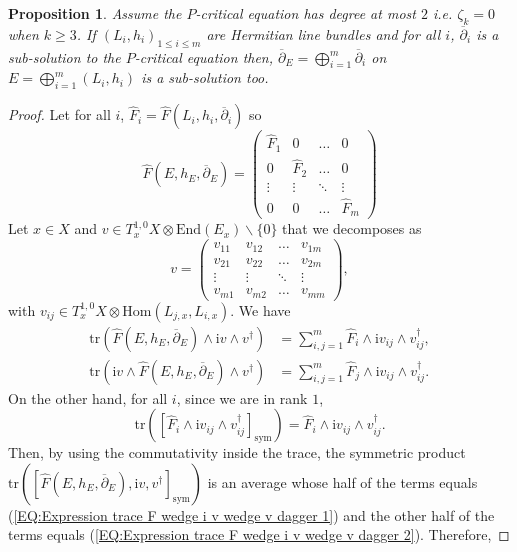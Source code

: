 \documentclass{article}
\newtheorem{proposition}[theorem]{Proposition}
\theoremstyle{remark}
\theoremstyle{definition}
\newcommand{\Hom}{\mathrm{Hom}}
\newcommand{\End}{\mathrm{End}}
\newcommand{\tr}{\mathrm{tr}}
\renewcommand{\i}{\boldsymbol{\mathrm{i}}}
\newcommand{\dbar}{\overline{\partial}}
\newcommand{\sym}{\mathrm{sym}}
\renewcommand{\leq}{\leqslant}
\renewcommand{\geq}{\geqslant}
\begin{document}
\begin{proposition}\label{PRO:Somme de sous-solutions fibrés}
    Assume the $P$-critical equation has degree at most $2$ \textit{i.e.} $\zeta_k = 0$ when $k \geq 3$. If $(L_i,h_i)_{1 \leq i \leq m}$ are Hermitian line bundles and for all $i$, $\dbar_i$ is a sub-solution to the $P$-critical equation then, $\dbar_E = \bigoplus_{i = 1}^m \dbar_i$ on $E = \bigoplus_{i = 1}^m (L_i,h_i)$ is a sub-solution too.
\end{proposition}
\begin{proof}
Let for all $i$, $\hat{F}_i = \hat{F}(L_i,h_i,\dbar_i)$ so
$$
\hat{F}(E,h_E,\dbar_E) =
\begin{pmatrix}
    \hat{F}_1 & 0 & \hdots & 0\\
    0 & \hat{F}_2 & \hdots & 0\\
    \vdots & \vdots & \ddots & \vdots\\
    0 & 0 & \hdots & \hat{F}_m
\end{pmatrix}
$$
Let $x \in X$ and $v \in T_x^{1,0}X \otimes \End(E_x)\backslash\{0\}$ that we decomposes as
$$
v =
\begin{pmatrix}
    v_{11} & v_{12} & \hdots & v_{1m}\\
    v_{21} & v_{22} & \hdots & v_{2m}\\
    \vdots & \vdots & \ddots & \vdots\\
    v_{m1} & v_{m2} & \hdots & v_{mm}
\end{pmatrix},
$$
with $v_{ij} \in T_x^{1,0}X \otimes \Hom(L_{j,x},L_{i,x})$. We have
\begin{align}
    \tr(\hat{F}(E,h_E,\dbar_E) \wedge \i v \wedge v^\dagger) & = \sum_{i,j = 1}^m \hat{F}_i \wedge \i v_{ij} \wedge v_{ij}^\dagger, \label{EQ:Expression trace F wedge i v wedge v dagger 1}\\
    \tr(\i v \wedge \hat{F}(E,h_E,\dbar_E) \wedge v^\dagger) & = \sum_{i,j = 1}^m \hat{F}_j \wedge \i v_{ij} \wedge v_{ij}^\dagger. \label{EQ:Expression trace F wedge i v wedge v dagger 2}
\end{align}
On the other hand, for all $i$, since we are in rank $1$,
$$
\tr([\hat{F}_i \wedge \i v_{ij} \wedge v_{ij}^\dagger]_\sym) = \hat{F}_i \wedge \i v_{ij} \wedge v_{ij}^\dagger.
$$
Then, by using the commutativity inside the trace, the symmetric product $\tr([\hat{F}(E,h_E,\dbar_E),\i v,v^\dagger]_\sym)$ is an average whose half of the terms equals (\ref{EQ:Expression trace F wedge i v wedge v dagger 1}) and the other half of the terms equals (\ref{EQ:Expression trace F wedge i v wedge v dagger 2}). Therefore,

\end{proof}
\end{document}
